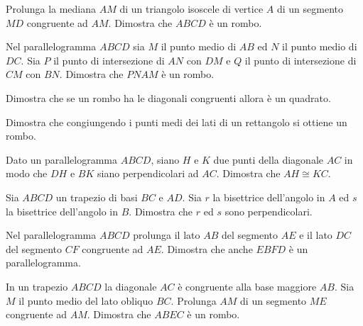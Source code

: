 \begin{multicols}{2}
\begin{esercizio}
\label{ese:4.20}
Prolunga la mediana $AM$ di un triangolo isoscele di vertice $A$ di 
un segmento $MD$ congruente ad $AM$. Dimostra che $ABCD$ è un rombo.
\end{esercizio}

\begin{esercizio}
\label{ese:4.21}
Nel parallelogramma $ABCD$ sia $M$ il punto medio di $AB$ ed $N$ il 
punto medio di $DC$. Sia $P$ il punto di intersezione di $AN$ con 
$DM$ e $Q$ il punto di intersezione di $CM$ con $BN$. Dimostra che 
$PNAM$ è un rombo.
\end{esercizio}

\begin{esercizio}
\label{ese:4.22}
Dimostra che se un rombo ha le diagonali congruenti allora è un 
quadrato.
\end{esercizio}

\begin{esercizio}
\label{ese:4.23}
Dimostra che congiungendo i punti medi dei lati di un rettangolo si 
ottiene un rombo.
\end{esercizio}

\begin{esercizio}
\label{ese:4.24}
Dato un parallelogramma $ABCD$, siano $H$ e $K$ due punti della 
diagonale $AC$ in modo che $DH$ e $BK$ siano perpendicolari ad $AC$. 
Dimostra che $AH\cong KC$.
\end{esercizio}

\begin{esercizio}
\label{ese:4.25}
Sia $ABCD$ un trapezio di basi $BC$ e $AD$. Sia $r$ la bisettrice 
dell'angolo in $A$ ed $s$ la bisettrice dell'angolo in $B$. Dimostra 
che $r$ ed $s$ sono perpendicolari.
\end{esercizio}

\begin{esercizio}
\label{ese:4.26}
Nel parallelogramma $ABCD$ prolunga il lato $AB$ del segmento $AE$ e 
il lato $DC$ del segmento $CF$ congruente ad $AE$. Dimostra che anche 
$EBFD$ è un parallelogramma.
\end{esercizio}

\begin{esercizio}
\label{ese:4.27}
In un trapezio $ABCD$ la diagonale $AC$ è congruente alla base 
maggiore $AB$. Sia $M$ il punto medio del lato obliquo $BC$. Prolunga 
$AM$ di un segmento $ME$ congruente ad $AM$. Dimostra che $ABEC$ è un 
rombo.
\end{esercizio}


\end{multicols}
